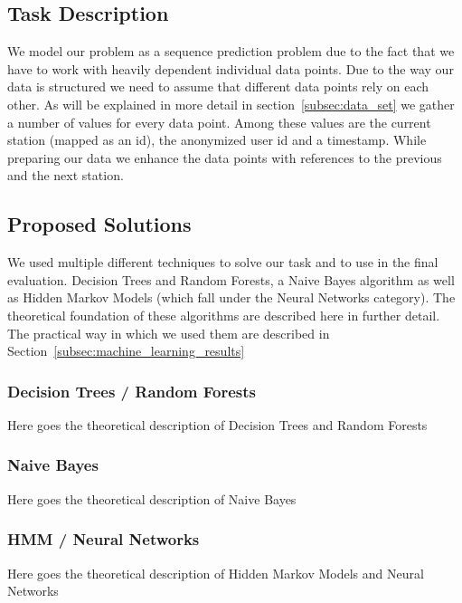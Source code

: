 \subsection{Task Description}
\label{subsec:task_description}
We model our problem as a sequence prediction problem due to the fact that we have to work with heavily dependent individual data points. Due to the way our data is structured we need to assume that different data points rely on each other. As will be explained in more detail in section~\ref{subsec:data_set} we gather a number of values for every data point. Among these values are the current station (mapped as an id), the anonymized user id and a timestamp. While preparing our data we enhance the data points with references to the previous and the next station.


\subsection{Proposed Solutions}
\label{subsec:proposed_solution}
We used multiple different techniques to solve our task and to use in the final evaluation. Decision Trees and Random Forests, a Naive Bayes algorithm as well as Hidden Markov Models (which fall under the Neural Networks category). The theoretical foundation of these algorithms are described here in further detail. The practical way in which we used them are described in Section~\ref{subsec:machine_learning_results}


\subsubsection{Decision Trees / Random Forests}
Here goes the theoretical description of Decision Trees and Random Forests

\subsubsection{Naive Bayes}
Here goes the theoretical description of Naive Bayes

\subsubsection{HMM / Neural Networks}
Here goes the theoretical description of Hidden Markov Models and Neural Networks